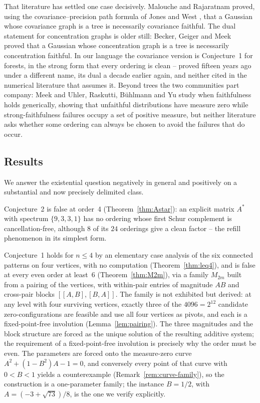 \documentclass[11pt]{article}
\theoremstyle{plain}
\theoremstyle{definition}
\theoremstyle{remark}
\begin{document}
\begin{humanblock}
That literature has settled one case decisively. Malouche and Rajaratnam \cite{Malouche} proved, using the covariance--precision path formula of Jones and West \cite{Jones}, that a Gaussian whose covariance graph is a tree is necessarily covariance faithful. The dual statement for concentration graphs is older still: Becker, Geiger and Meek~\cite{Becker} proved that a Gaussian whose concentration graph is a tree is necessarily concentration faithful. In our language the covariance version is Conjecture~1 for forests, in the strong form that every ordering is clean -- proved fifteen years ago under a different name, its dual a decade earlier again, and neither cited in the numerical literature that assumes it. Beyond trees the two communities part company: Meek \cite{Meek} and Uhler, Raskutti, B\"uhlmann and Yu \cite{Uhler} study when faithfulness holds generically, showing that unfaithful distributions have measure zero while strong-faithfulness failures occupy a set of positive measure, but neither literature asks whether some ordering can always be chosen to avoid the failures that do occur.

\subsection{Results}

We answer the existential question negatively in general and positively on a substantial and now precisely delimited class.

Conjecture~2 is false at order~4 (Theorem~\ref{thm:Astar}): an explicit matrix $A^*$ with spectrum $\{9,3,3,1\}$ has no ordering whose first Schur complement is cancellation-free, although $8$ of its $24$ orderings give a clean factor -- the refill phenomenon in its simplest form.

Conjecture~1 holds for $n\le4$ by an elementary case analysis of the six connected patterns on four vertices, with no computation (Theorem~\ref{thm:leq4}), and is false at every even order at least~6 (Theorem~\ref{thm:M2m}), via a family $M_{2m}$ built from a pairing of the vertices, with within-pair entries of magnitude $AB$ and cross-pair blocks $[[A,B],[B,A]]$. The family is not exhibited but derived: at any level with four surviving vertices, exactly three of the $4096=2^{12}$ candidate zero-configurations are feasible and use all four vertices as pivots, and each is a fixed-point-free involution (Lemma~\ref{lem:pairing}). The three magnitudes and the block structure are forced as the unique solution of the resulting additive system; the requirement of a fixed-point-free involution is precisely why the order must be even. The parameters are forced onto the measure-zero curve $A^2+(1-B^2)A-1=0$, and conversely every point of that curve with $0<B<1$ yields a counterexample (Remark~\ref{rem:curve-family}), so the construction is a one-parameter family; the instance $B=1/2$, with $A=(-3+\sqrt{73})/8$, is the one we verify explicitly.


\end{humanblock}
\end{document}
